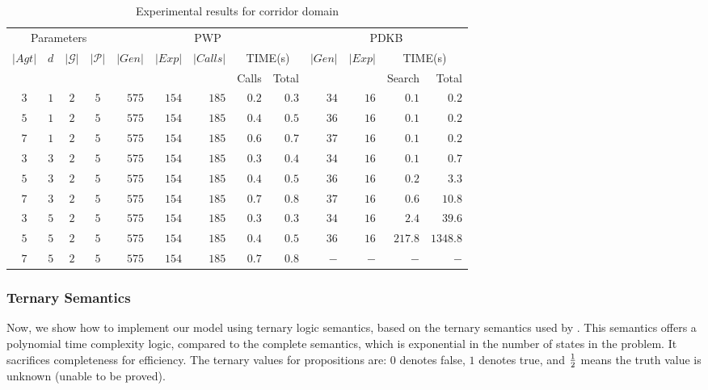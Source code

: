\begin{table*}[ht]
    \centering
    \small
    \begin{tabular}{ccccrrrrrrrrr}
         \toprule
          \multicolumn{4}{c}{Parameters} & \multicolumn{5}{c}{PWP} & \multicolumn{4}{c}{PDKB} \\ 
          \cmidrule(lr){1-4} \cmidrule(lr){5-9} \cmidrule(lr){10-13}
          \multirow{2}{*}{$|Agt|$} & \multirow{2}{*}{$d$} & \multirow{2}{*}{$|\mathcal{G}|$} & \multirow{2}{*}{$|\mathcal{P}|$} & \multirow{2}{*}{$|Gen|$} & \multirow{2}{*}{$|Exp|$} & \multirow{2}{*}{$|Calls|$} & \multicolumn{2}{c}{TIME(s)} & \multirow{2}{*}{$|Gen|$} & \multirow{2}{*}{$|Exp|$}&\multicolumn{2}{c}{TIME(s)}
          \\ & & & & & & & {Calls} & Total & & & Search & Total \\
         \midrule

            $3$ & $1$ & $2$ & $5$ & $575$ & $154$ & $185$ & $0.2$ & $0.3$ & $34$ & $16$ & $0.1$& $0.2$\\
            $5$ & $1$ & $2$ & $5$ & $575$ & $154$ & $185$ & $0.4$ & $0.5$ & $36$ & $16$ & $0.1$ & $0.2$\\
            $7$ & $1$ & $2$ & $5$ & $575$ & $154$ & $185$ & $0.6$ & $0.7$ & $37$ & $16$ & $0.1$ & $0.2$\\
            $3$ & $3$ & $2$ & $5$ & $575$ & $154$ & $185$ & $0.3$ & $0.4$ & $34$ & $16$ & $0.1$ & $0.7$\\
            $5$ & $3$ & $2$ & $5$ & $575$ & $154$ & $185$ & $0.4$ & $0.5$ & $36$ & $16$ & $0.2$ & $3.3$\\
            $7$ & $3$ & $2$ & $5$ & $575$ & $154$ & $185$ & $0.7$ & $0.8$ & $37$ & $16$ & $0.6$ & $10.8$\\
            $3$ & $5$ & $2$ & $5$ & $575$ & $154$ & $185$ & $0.3$ & $0.3$ & $34$ & $16$ & $2.4$ & $39.6$\\
            $5$ & $5$ & $2$ & $5$ & $575$ & $154$ & $185$ & $0.4$ & $0.5$ & $36$ & $16$ & $217.8$ & $1348.8$\\
            $7$ & $5$ & $2$ & $5$ & $575$ & $154$ & $185$ & $0.7$ & $0.8$ & $-$ & $-$ & $-$ & $-$\\
                  
        \bottomrule
    \end{tabular}
    \caption{Experimental results for corridor domain}
    \label{tab:corridor}
\end{table*}


\subsubsection{Ternary Semantics}
Now, we show how to implement our model using ternary logic semantics, based on the ternary semantics used by \citet{Hu2022-ul}. This semantics offers a polynomial time complexity logic, compared to the complete semantics, which is exponential in the number of states in the problem. It sacrifices completeness for efficiency. The ternary values for propositions are: $0$ denotes false, $1$ denotes true, and $\frac{1}{2}$ means the truth value is unknown (unable to be proved). 


